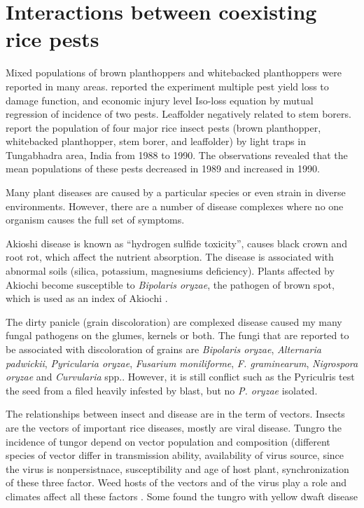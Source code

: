 \documentclass[12pt, oneside]{report}
\begin{document}
\section*{Interactions between coexisting rice pests}

Mixed populations of brown planthoppers and whitebacked planthoppers were reported in many areas. \cite{naganagoud2010studies} reported the experiment multiple pest yield loss to damage function, and economic injury level Iso-loss equation by mutual regression of incidence of two pests. Leaffolder negatively related to stem borers. \cite{selvaraj2012determination} report the population of four major rice insect pests (brown planthopper, whitebacked planthopper, stem borer, and leaffolder) by light traps in Tungabhadra area, India from 1988 to 1990. The observations revealed that the mean populations of these pests decreased in 1989 and increased in 1990.

Many plant diseases are caused by a particular species or even strain in diverse environments. However, there are a number of disease complexes where no one organism causes the full set of symptoms.

Akioshi disease is known as ``hydrogen sulfide toxicity'', causes black crown and root rot, which affect the nutrient absorption. The disease is associated with abnormal soils (silica, potassium, magnesiums deficiency). Plants affected by Akiochi become susceptible to \textit{Bipolaris oryzae}, the pathogen of brown spot, which is used as an index of Akiochi \citep{ouricedisease}.


The dirty panicle (grain discoloration) are complexed disease caused my many fungal pathogens on the glumes, kernels or both. The fungi that are reported to be associated with discoloration of grains are \textit{Bipolaris oryzae}, \textit{Alternaria padwickii}, \textit{Pyricularia oryzae}, \textit{Fusarium moniliforme}, \textit{F. graminearum}, \textit{Nigrospora oryzae} and \textit{Curvularia} spp.\cite{ouricedisease}. However, it is still conflict such as the Pyriculris test the seed from a filed heavily infested by blast, but no \textit{P. oryzae} isolated.

The relationships between insect and disease are in the term of vectors. Insects are the vectors of important rice diseases, mostly are viral disease. Tungro the incidence of tungor depend on vector population and composition (different species of vector differ in transmission ability,  availability of virus source, since the virus is nonpersistnace, susceptibility and age of host plant, synchronization of these three factor. Weed hosts of the vectors and of the virus play a role and climates affect all these factors \cite{naganagoud2010studies}. Some found the tungro with yellow dwaft disease \cite{ouricedisease}
\end{document}
